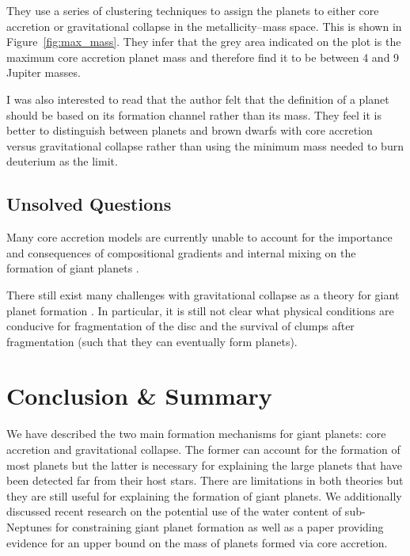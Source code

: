 \documentclass[twocolumn]{aastex631}
\begin{document}
They use a series of clustering techniques to assign the planets to either core accretion or gravitational collapse in the metallicity--mass space. This is shown in Figure~\ref{fig:max_mass}. They infer that the grey area indicated on the plot is the maximum core accretion planet mass and therefore find it to be between 4 and 9 Jupiter masses.

I was also interested to read that the author felt that the definition of a planet should be based on its formation channel rather than its mass. They feel it is better to distinguish between planets and brown dwarfs with core accretion versus gravitational collapse rather than using the minimum mass needed to burn deuterium as the limit.

\subsection{Unsolved Questions}

Many core accretion models are currently unable to account for the importance and consequences of compositional gradients and internal mixing on the formation of giant planets \citep{D'Angelo+2018}.

There still exist many challenges with gravitational collapse as a theory for giant planet formation \citep{Forgan+2013}. In particular, it is still not clear what physical conditions are conducive for fragmentation of the disc and the survival of clumps after fragmentation (such that they can eventually form planets).

\section{Conclusion \& Summary}
We have described the two main formation mechanisms for giant planets: core accretion and gravitational collapse. The former can account for the formation of most planets but the latter is necessary for explaining the large planets that have been detected far from their host stars. There are limitations in both theories but they are still useful for explaining the formation of giant planets. We additionally discussed recent research on the potential use of the water content of sub-Neptunes for constraining giant planet formation as well as a paper providing evidence for an upper bound on the mass of planets formed via core accretion.


{}

\appendix
\end{document}
